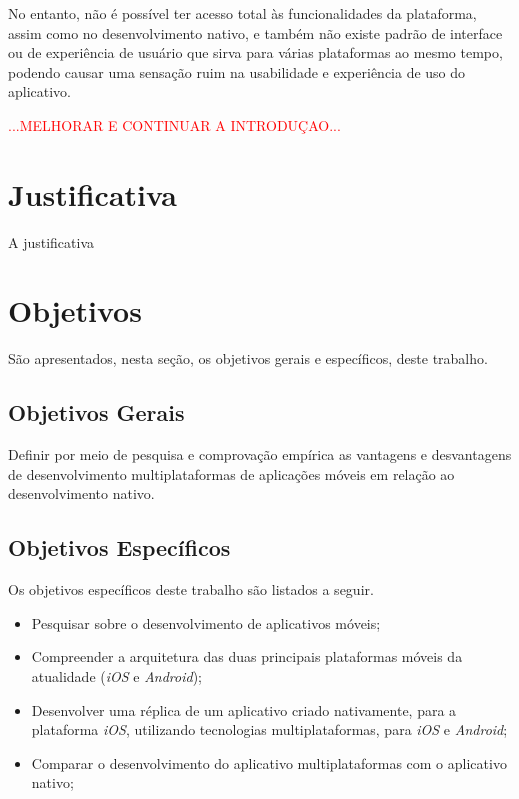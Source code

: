 No entanto, não é possível ter acesso total às funcionalidades da plataforma, assim como no desenvolvimento nativo, e também não existe padrão de interface ou de experiência de usuário que sirva
para várias plataformas ao mesmo tempo, podendo causar uma sensação ruim na usabilidade e experiência de uso do aplicativo.

\textcolor{red}{...MELHORAR E CONTINUAR A INTRODUÇAO...}

\section{Justificativa}\label{sec:justificativa}

A justificativa

\section{Objetivos} \label{sec:objetivos}

São apresentados, nesta seção, os objetivos gerais e específicos, deste trabalho. 

\subsection{Objetivos Gerais}  \label{subsec:objetivos_gerais}

Definir por meio de pesquisa e comprovação empírica as vantagens e desvantagens de desenvolvimento multiplataformas de aplicações móveis em relação ao desenvolvimento nativo. 

\subsection{Objetivos Específicos}  \label{subsec:objetivos_especificos}

Os objetivos específicos deste trabalho são listados a seguir.

\begin{itemize}
    \item Pesquisar sobre o desenvolvimento de aplicativos móveis;
    \item Compreender a arquitetura das duas principais plataformas móveis da atualidade (\textit{iOS} e \textit{Android});
    \item Desenvolver uma réplica de um aplicativo criado nativamente, para a plataforma \textit{iOS}, utilizando tecnologias multiplataformas, para \textit{iOS} e \textit{Android};
    \item Comparar o desenvolvimento do aplicativo multiplataformas com o aplicativo nativo;
\end{itemize}

